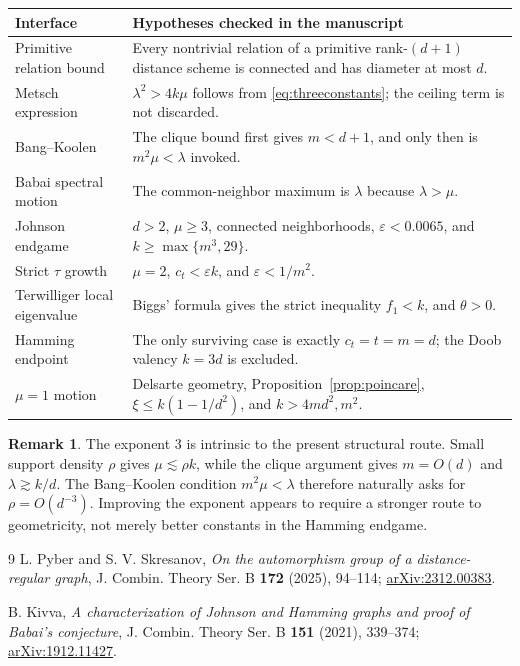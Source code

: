 \documentclass[11pt]{amsart}
\theoremstyle{definition}
\newtheorem{remark}[theorem]{Remark}
\newcommand{\eps}{\varepsilon}
\begin{document}
\begin{center}
\small
\begin{tabular}{@{}>{\raggedright\arraybackslash}p{}p{}@{}}
\toprule
Interface & Hypotheses checked in the manuscript \\
\midrule
Primitive relation bound & Every nontrivial relation of a primitive rank-$(d+1)$ distance scheme is connected and has diameter at most $d$. \\
Metsch expression & $\lambda^2>4k\mu$ follows from \eqref{eq:threeconstants}; the ceiling term is not discarded. \\
Bang--Koolen & The clique bound first gives $m<d+1$, and only then is $m^2\mu<\lambda$ invoked. \\
Babai spectral motion & The common-neighbor maximum is $\lambda$ because $\lambda>\mu$. \\
Johnson endgame & $d>2$, $\mu\ge3$, connected neighborhoods, $\eps<0.0065$, and $k\ge\max\{m^3,29\}$. \\
Strict $\tau$ growth & $\mu=2$, $c_t<\eps k$, and $\eps<1/m^2$. \\
Terwilliger local eigenvalue & Biggs' formula gives the strict inequality $f_1<k$, and $\theta>0$. \\
Hamming endpoint & The only surviving case is exactly $c_t=t=m=d$; the Doob valency $k=3d$ is excluded. \\
$\mu=1$ motion & Delsarte geometry, Proposition~\ref{prop:poincare}, $\xi\le k(1-1/d^2)$, and $k>4md^2,m^2$. \\
\bottomrule
\end{tabular}
\end{center}

\begin{remark}
The exponent $3$ is intrinsic to the present structural route.  Small support density $\rho$ gives $\mu\lesssim\rho k$, while the clique argument gives $m=O(d)$ and $\lambda\gtrsim k/d$.  The Bang--Koolen condition $m^2\mu<\lambda$ therefore naturally asks for $\rho=O(d^{-3})$.  Improving the exponent appears to require a stronger route to geometricity, not merely better constants in the Hamming endgame.
\end{remark}

\begin{thebibliography}{9}
L. Pyber and S. V. Skresanov,
\emph{On the automorphism group of a distance-regular graph},
J. Combin. Theory Ser. B \textbf{172} (2025), 94--114;
\href{https://arxiv.org/abs/2312.00383}{arXiv:2312.00383}.

B. Kivva,
\emph{A characterization of Johnson and Hamming graphs and proof of Babai's conjecture},
J. Combin. Theory Ser. B \textbf{151} (2021), 339--374;
\href{https://arxiv.org/abs/1912.11427}{arXiv:1912.11427}.
\end{thebibliography}
\end{document}
